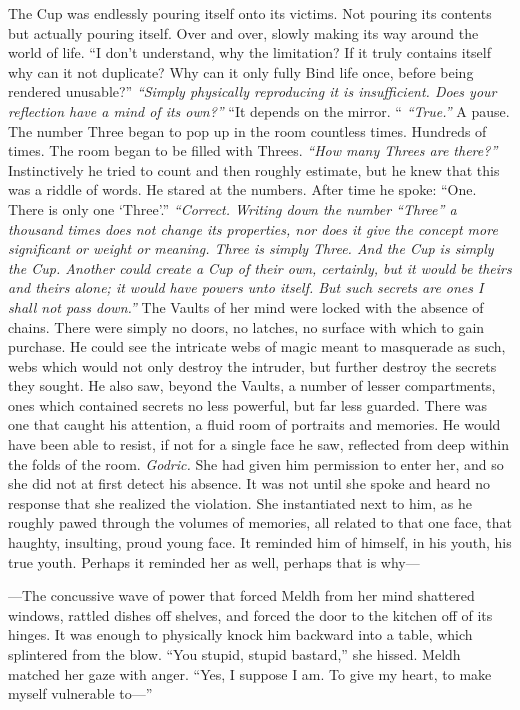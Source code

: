 \begin{flushright}
The Cup was endlessly pouring itself onto its victims. Not pouring its contents but actually pouring itself. Over and over, slowly making its way around the world of life.
\SmallVSpace
“I don’t understand, why the limitation? If it truly contains itself why can it not duplicate? Why can it only fully Bind life once, before being rendered unusable?”
\SmallVSpace
\emph{“Simply physically reproducing it is insufficient. Does your reflection have a mind of its own?”}
\SmallVSpace
“It depends on the mirror. “
\SmallVSpace
\emph{“True.”} A pause. The number Three began to pop up in the room countless times. Hundreds of times. The room began to be filled with Threes. \emph{“How many Threes are there?”}
\SmallVSpace
Instinctively he tried to count and then roughly estimate, but he knew that this was a riddle of words. He stared at the numbers. After time he spoke: “One. There is only one ‘Three’.”
\SmallVSpace
\emph{“Correct. Writing down the number “Three” a thousand times does not change its properties, nor does it give the concept more significant or weight or meaning. Three is simply Three. And the Cup is simply the Cup. Another could create a Cup of their own, certainly, but it would be theirs and theirs alone; it would have powers unto itself. But such secrets are ones I shall not pass down.”}
\SmallVSpace
The Vaults of her mind were locked with the absence of chains. There were simply no doors, no latches, no surface with which to gain purchase. He could see the intricate webs of magic meant to masquerade as such, webs which would not only destroy the intruder, but further destroy the secrets they sought.
\SmallVSpace
He also saw, beyond the Vaults, a number of lesser compartments, ones which contained secrets no less powerful, but far less guarded. There was one that caught his attention, a fluid room of portraits and memories. He would have been able to resist, if not for a single face he saw, reflected from deep within the folds of the room.
\SomeVSpace
\emph{Godric.}
\SomeVSpace
She had given him permission to enter her, and so she did not at first detect his absence. It was not until she spoke and heard no response that she realized the violation.
\SmallVSpace
She instantiated next to him, as he roughly pawed through the volumes of memories, all related to that one face, that haughty, insulting, proud young face. It reminded him of himself, in his youth, his true youth. Perhaps it reminded her as well, perhaps that is why\mbox{---}
\end{flushright}
\mbox{---}The concussive wave of power that forced Meldh from her mind shattered windows, rattled dishes off shelves, and forced the door to the kitchen off of its hinges. It was enough to physically knock him backward into a table, which splintered from the blow.
\SmallVSpace
“You stupid, stupid bastard,” she hissed.
\SmallVSpace
Meldh matched her gaze with anger. “Yes, I suppose I am. To give my heart, to make myself vulnerable to\mbox{---}”

